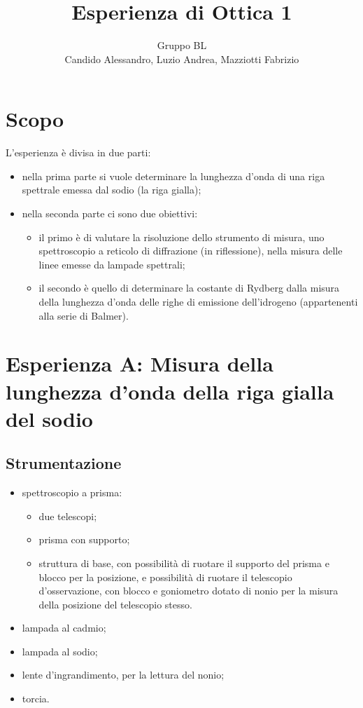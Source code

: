\documentclass[a4paper,10pt]{article}
\title{Esperienza di Ottica 1}
\author{Gruppo BL \\ Candido Alessandro, Luzio Andrea, Mazziotti Fabrizio}
\begin{document}
\maketitle

\section{Scopo}
L'esperienza è divisa in due parti:
\begin{itemize}
	\item nella prima parte si vuole determinare la lunghezza d’onda di una riga spettrale emessa dal sodio (la riga gialla);
	\item nella seconda parte ci sono due obiettivi:
	\begin{itemize}
		\item il primo è di valutare la risoluzione dello strumento di misura, uno spettroscopio a reticolo di diffrazione (in riflessione), nella misura delle linee emesse da lampade spettrali;
		\item il secondo è quello di determinare la costante di Rydberg dalla misura della lunghezza d’onda delle righe di emissione dell’idrogeno (appartenenti alla serie di Balmer).
	\end{itemize}
\end{itemize}



\section{Esperienza A: Misura della lunghezza d'onda della riga gialla del sodio}

\subsection{Strumentazione}

\begin{itemize}
	\item spettroscopio a prisma:
	\begin{itemize}
		\item due telescopi;
		\item prisma con supporto;
		\item struttura di base, con possibilità di ruotare il supporto del prisma e blocco per la posizione, e possibilità di ruotare il telescopio d'osservazione, con blocco e goniometro dotato di nonio per la misura della posizione del telescopio stesso.
	\end{itemize}
	\item lampada al cadmio;
	\item lampada al sodio;
	\item lente d'ingrandimento, per la lettura del nonio;
	\item torcia.
\end{itemize}
\end{document}
